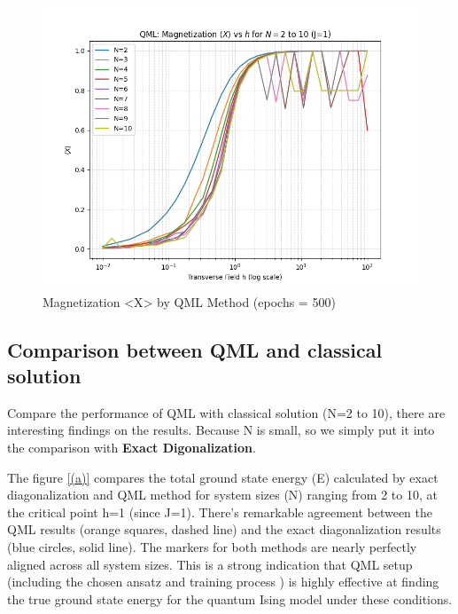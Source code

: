 \documentclass[pre,twocolumn,floatfix]{revtex4-1}
\begin{document}
\begin{figure}[H]
    \centering
    \includegraphics[width=0.5\linewidth]{images/magnetization_vs_h_multiprocess.png}
    \caption{Magnetization <X> by QML Method (epochs = 500)}
    \label{12}
\end{figure}

\subsection{Comparison between QML and classical solution}
Compare the performance of QML with classical solution (N=2 to 10), there are interesting findings on the results. Because N is small, so we simply put it into the comparison with \textbf{Exact Digonalization}.

The figure \ref{(a)} compares the total ground state energy (E) calculated by exact diagonalization and QML method for system sizes (N) ranging from 2 to 10, at the critical point h=1 (since J=1). There's remarkable agreement between the QML results (orange squares, dashed line) and the exact diagonalization results (blue circles, solid line). The markers for both methods are nearly perfectly aligned across all system sizes. This is a strong indication that QML setup (including the chosen ansatz and training process ) is highly effective at finding the true ground state energy for the quantum Ising model under these conditions. 
\end{document}
